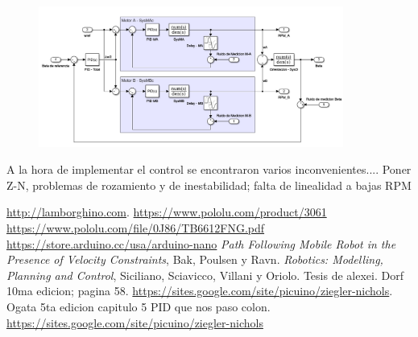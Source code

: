 \documentclass[10pt,conference,a4paper,onecolumn]{article}%
\begin{document}
\begin{figure}[h]
\centering
\includegraphics[width=10cm]{./imagenes/sistema_total}
\caption{}
\end{figure}


A la hora de implementar el control se encontraron varios inconvenientes.... Poner Z-N, problemas de rozamiento y de inestabilidad; falta de linealidad a bajas RPM


\begin{thebibliography}{X}
 \url{http://lamborghino.com}. 
\url{https://www.pololu.com/product/3061}
\url{ https://www.pololu.com/file/0J86/TB6612FNG.pdf}
 \url{https://store.arduino.cc/usa/arduino-nano}
 \textit{Path Following Mobile Robot in the Presence of Velocity Constraints}, Bak, Poulsen y Ravn.
 \textit{Robotics: Modelling, Planning and Control}, Siciliano, Sciavicco, Villani y Oriolo.
 Tesis de alexei.
 Dorf 10ma edicion; pagina 58.
 \url{https://sites.google.com/site/picuino/ziegler-nichols}.
 Ogata 5ta edicion capitulo 5
 PID que nos paso colon.
\url{https://sites.google.com/site/picuino/ziegler-nichols}
\end{thebibliography}
\end{document}
